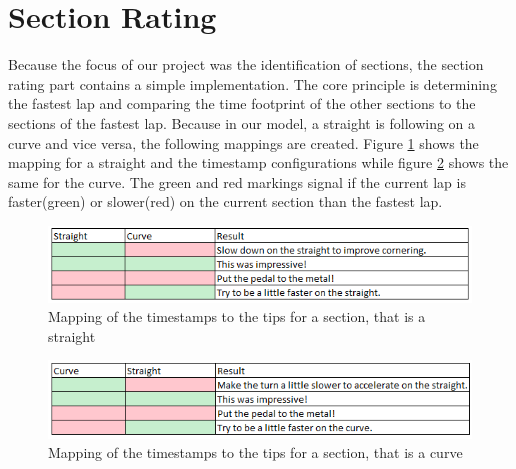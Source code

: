 \section{Section Rating}
Because the focus of our project was the identification of sections, the section rating part contains a simple implementation. The core principle is determining the fastest lap and comparing the time footprint of the other sections to the sections of the fastest lap. Because in our model, a straight is following on a curve and vice versa, the following mappings are created. Figure \ref{StraightResultMapping} shows the mapping for a straight and the timestamp configurations while figure \ref{CurveResultMapping} shows the same for the curve. The green and red markings signal if the current lap is faster(green) or slower(red) on the current section than the fastest lap.
\begin{figure}[H]
	\centering
	\includegraphics[scale= 0.9]{Pictures/StraightResultMapping.png}
	\caption{Mapping of the timestamps to the tips for a section, that is a straight}
	\label{StraightResultMapping}
\end{figure}

\begin{figure}[H]
	\centering
	\includegraphics[scale= 0.9]{Pictures/CurveResultMapping.png}
	\caption{Mapping of the timestamps to the tips for a section, that is a curve}
	\label{CurveResultMapping}
\end{figure}
